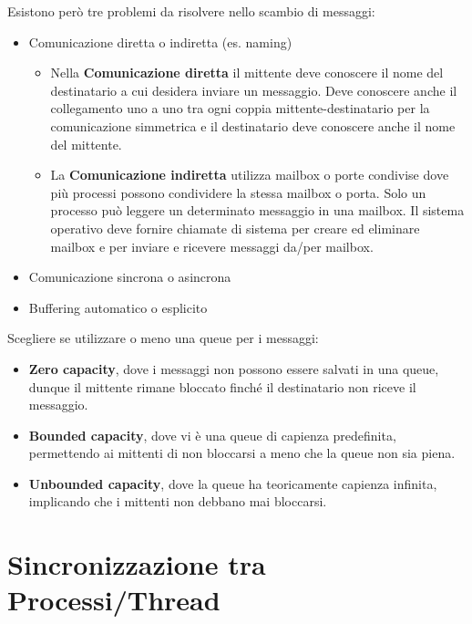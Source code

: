 \documentclass{article}
\begin{document}
Esistono però tre problemi da risolvere nello scambio di messaggi:\\

\begin{itemize}
    \item Comunicazione diretta o indiretta (es. naming) 
    \begin{itemize}
        \item Nella \textbf{Comunicazione diretta} il mittente deve conoscere il nome del destinatario a cui desidera inviare un messaggio. Deve conoscere anche il collegamento uno a uno tra ogni coppia mittente-destinatario per la comunicazione simmetrica e il destinatario deve conoscere anche il nome del mittente.
        \item La \textbf{Comunicazione indiretta} utilizza mailbox o porte condivise dove più processi possono condividere la stessa mailbox o porta. Solo un processo può leggere un determinato messaggio in una mailbox. Il sistema operativo deve fornire chiamate di sistema per creare ed eliminare mailbox e per inviare e ricevere messaggi da/per mailbox. 
    \end{itemize}
    \item Comunicazione sincrona o asincrona 
    \item Buffering automatico o esplicito
\end{itemize}
Scegliere se utilizzare o meno una queue per i messaggi:

\begin{itemize}
    \item \textbf{Zero capacity}, dove i messaggi non possono essere salvati in una queue, dunque il mittente rimane bloccato finché il destinatario non riceve il messaggio.
    \item \textbf{Bounded capacity}, dove vi è una queue di capienza predefinita, permettendo ai mittenti di non bloccarsi a meno che la queue non sia piena.
    \item \textbf{Unbounded capacity}, dove la queue ha teoricamente capienza infinita, implicando che i mittenti non debbano mai bloccarsi.
\end{itemize}


\pagebreak

\section{Sincronizzazione tra Processi/Thread}
\pagebreak
\end{document}
